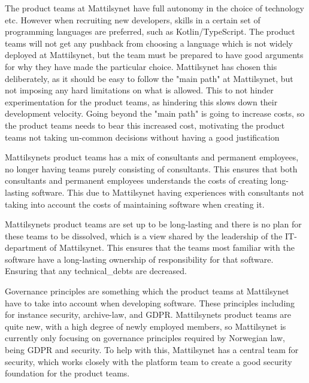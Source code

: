 The product teams at Mattilsynet have full autonomy in the choice of technology etc. However when recruiting new developers, skills in a certain set of programming languages are preferred, such as Kotlin/TypeScript. The product teams will not get any pushback from choosing a language which is not widely deployed at Mattilsynet, but the team must be prepared to have good arguments for why they have made the particular choice. Mattilsynet has chosen this deliberately, as it should be easy to follow the "main path" at Mattilsynet, but not imposing any hard limitations on what is allowed. This to not hinder experimentation for the product teams, as hindering this slows down their development velocity. Going beyond the "main path" is going to increase costs, so the product teams needs to bear this increased cost, motivating the product teams not taking un-common decisions without having a good justification

Mattilsynets product teams has a mix of consultants and permanent employees, no longer having teams purely consisting of consultants. This ensures that both consultants and permanent employees understands the costs of creating long-lasting software. This due to Mattilsynet having experiences with consultants not taking into account the costs of maintaining software when creating it.

Mattilsynets product teams are set up to be long-lasting and there is no plan for these teams to be dissolved, which is a view shared by the leadership of the IT-department of Mattilsynet. This ensures that the teams most familiar with the software have a long-lasting ownership of responsibility for that software. Ensuring that any \gls{technical_debt}s are decreased.

Governance principles are something which the product teams at Mattilsynet have to take into account when developing software. These principles including for instance security, archive-law, and GDPR. Mattilsynets product teams are quite new, with a high degree of newly employed members, so Mattilsynet is currently only focusing on governance principles required by Norwegian law, being GDPR and security. To help with this, Mattilsynet has a central team for security, which works closely with the platform team to create a good security foundation for the product teams.


